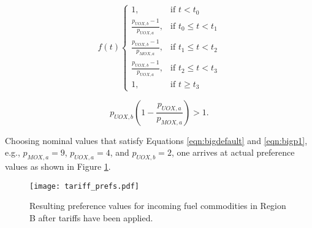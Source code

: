 \begin{equation}\label{eqn:tariff}
f(t)
\begin{cases}
1, & \text{if } t < t_0 \\
\frac{p_{UOX, b} - 1}{p_{UOX, a}}, & \text{if } t_0 \leq t < t_1 \\
\frac{p_{UOX, b} - 1}{p_{MOX, a}}, & \text{if } t_1 \leq t < t_2 \\
\frac{p_{UOX, b} - 1}{p_{UOX, a}}, & \text{if } t_2 \leq t < t_3 \\
1, & \text{if } t \geq t_3
\end{cases} 
\end{equation}

\begin{equation}\label{eqn:bigp1}
  p_{UOX, b} \left( 1 - \frac{p_{UOX, a}}{p_{MOX, a}} \right) > 1.
\end{equation}

Choosing nominal values that satisfy Equations \ref{eqn:bigdefault} and
\ref{eqn:bigp1}, e.g., $p_{MOX, a} = 9$, $p_{UOX, a} = 4$, and $p_{UOX, b} = 2$,
one arrives at actual preference values as shown in Figure \ref{fig:prefs}.

\begin{figure}
  \begin{center}
    \texttt{[image: tariff\_prefs.pdf]}
    \caption[]{
      \label{fig:prefs}
      Resulting preference values for incoming fuel commodities in Region B
      after tariffs have been applied.}
  \end{center}
\end{figure}





